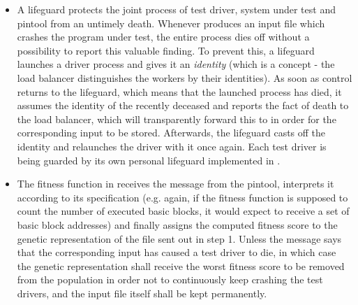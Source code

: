 \begin{itemize}
  \item A lifeguard protects the joint process of test driver, system under test and pintool from an untimely
  death. Whenever \xmlmate produces an input file which crashes the program under test, the entire process dies
  off without a possibility to report this valuable finding. To prevent this, a lifeguard launches a driver
  process and gives it an \emph{identity} (which is a \zmq concept - the load balancer distinguishes the
  workers by their identities). As soon as control returns to the lifeguard, which means that the launched
  process has died, it assumes the identity of the recently deceased and reports the fact of death to the load
  balancer, which will transparently forward this to \xmlmate in order for the corresponding input to be
  stored. Afterwards, the lifeguard casts off the identity and relaunches the driver with it once again.
  Each test driver is being guarded by its own personal lifeguard implemented in \python.
  
  \item The fitness function in \xmlmate receives the message from the pintool, interprets it according to 
  its specification (e.g. again, if the fitness function is supposed to count the number of executed basic blocks, 
  it would expect to receive a set of basic block addresses) and finally assigns the computed fitness score to 
  the genetic representation of the \xml file sent out in step 1. Unless the message says that the
  corresponding input has caused a test driver to die, in which case the genetic representation shall receive
  the worst fitness score to be removed from the population in order not to continuously keep crashing the test
  drivers, and the input file itself shall be kept permanently.
\end{itemize}

